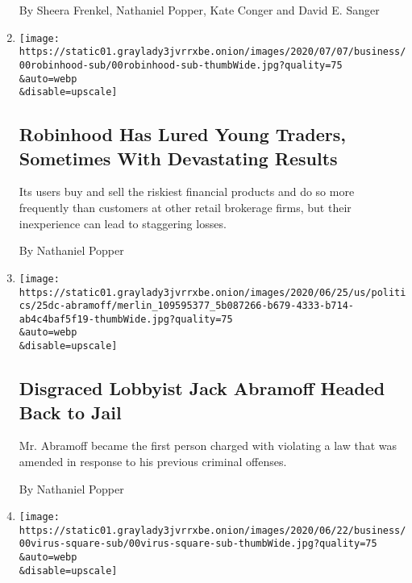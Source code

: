 \begin{enumerate}
  By Sheera Frenkel, Nathaniel Popper, Kate Conger and David E. Sanger
\item
  \href{/2020/07/08/technology/robinhood-risky-trading.html}{}

  \texttt{[image: https://static01.graylady3jvrrxbe.onion/images/2020/07/07/business/00robinhood-sub/00robinhood-sub-thumbWide.jpg?quality=75\\\&auto=webp\\\&disable=upscale]}

  \hypertarget{robinhood-has-lured-young-traders-sometimes-with-devastating-results}{%
  \subsection{Robinhood Has Lured Young Traders, Sometimes With
  Devastating
  Results}\label{robinhood-has-lured-young-traders-sometimes-with-devastating-results}}

  Its users buy and sell the riskiest financial products and do so more
  frequently than customers at other retail brokerage firms, but their
  inexperience can lead to staggering losses.

  By Nathaniel Popper
\item
  \href{/2020/06/25/us/politics/jack-abramoff-marijuana-cryptocurrency.html}{}

  \texttt{[image: https://static01.graylady3jvrrxbe.onion/images/2020/06/25/us/politics/25dc-abramoff/merlin\_109595377\_5b087266-b679-4333-b714-ab4c4baf5f19-thumbWide.jpg?quality=75\\\&auto=webp\\\&disable=upscale]}

  \hypertarget{disgraced-lobbyist-jack-abramoff-headed-back-to-jail}{%
  \subsection{Disgraced Lobbyist Jack Abramoff Headed Back to
  Jail}\label{disgraced-lobbyist-jack-abramoff-headed-back-to-jail}}

  Mr. Abramoff became the first person charged with violating a law that
  was amended in response to his previous criminal offenses.

  By Nathaniel Popper
\item
  \href{/2020/06/23/technology/square-jack-dorsey-pandemic-withholding.html}{}

  \texttt{[image: https://static01.graylady3jvrrxbe.onion/images/2020/06/22/business/00virus-square-sub/00virus-square-sub-thumbWide.jpg?quality=75\\\&auto=webp\\\&disable=upscale]}

  \hypertarget{square-jack-dorseys-pay-service-is-withholding-money-merchants-say-they-need}{%
}
\end{enumerate}
